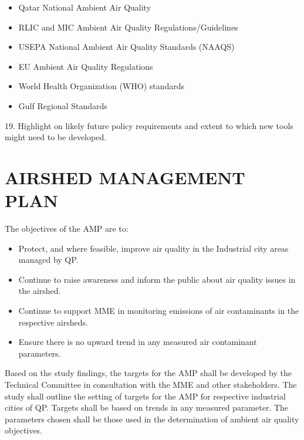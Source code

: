 \begin{itemize}
\item Qatar National Ambient Air Quality 
\item RLIC and MIC Ambient Air Quality Regulations/Guidelines 
\item USEPA National Ambient Air Quality Standards (NAAQS) 
\item EU Ambient Air Quality Regulations 
\item World Health Organization (WHO) standards
\item Gulf Regional Standards 
\end{itemize}

19. Highlight on likely future policy requirements and extent to which new tools might need to be developed.

\section{AIRSHED MANAGEMENT PLAN}
The objectives of the AMP are to:

\begin{itemize}
\item Protect, and where feasible, improve air quality in the Industrial city areas managed by QP.
\item Continue to raise awareness and inform the public about air quality issues in the airshed.
\item Continue to support MME in monitoring emissions of air contaminants in the respective airsheds.
\item Ensure there is no upward trend in any measured air contaminant parameters. 
\end{itemize} 


Based on the study findings, the targets for the AMP shall be developed by the Technical Committee in consultation with the MME and other stakeholders. The study shall outline the setting of targets for the AMP for respective industrial cities of QP. Targets shall be based on trends in any measured parameter. The parameters chosen shall be those used in the determination of ambient air quality objectives. 
